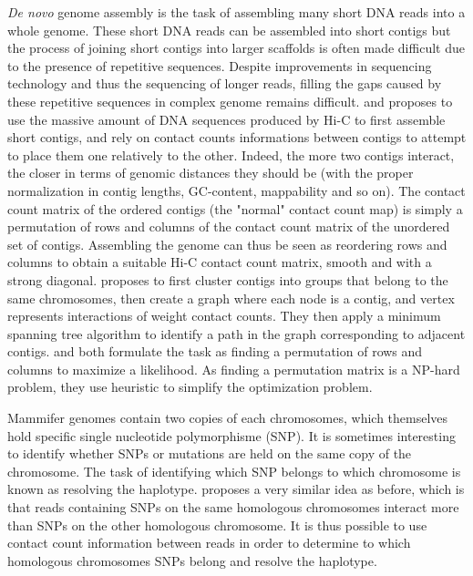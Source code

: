 \textit{De novo} genome assembly is the task of assembling many short DNA
reads into a whole genome. These short DNA reads can be assembled into short
contigs but the process of joining short contigs into larger scaffolds is
often made difficult due to the presence of repetitive sequences. Despite
improvements in sequencing technology and thus the sequencing of longer reads,
filling the gaps caused by these repetitive sequences in complex genome
remains difficult. \citet{burton:chromosome} and
\citet{kaplan:high-throughput} proposes to use the massive amount of DNA
sequences produced by Hi-C to first assemble short contigs, and rely on
contact counts informations between contigs to attempt to place them one
relatively to the other. Indeed, the more two contigs interact, the closer in
terms of genomic distances they should be (with the proper normalization in
contig lengths, GC-content, mappability and so on). The contact count matrix
of the ordered contigs (the "normal" contact count map) is simply a
permutation of rows and columns of the contact count matrix of the unordered
set of contigs. Assembling the genome can thus be seen as reordering rows and
columns to obtain a suitable Hi-C contact count matrix, smooth and with a
strong diagonal. \citet{burton:chromosome} proposes to first cluster contigs
into groups that belong to the same chromosomes, then create a graph where
each node is a contig, and vertex represents interactions of weight contact
counts. They then apply a minimum spanning tree algorithm to identify a path
in the graph corresponding to adjacent contigs. \citet{kaplan:high-throughput}
and \citet{marie-nelly:high-quality} both formulate the task as finding a
permutation of rows and columns to maximize a likelihood. As finding a
permutation matrix is a NP-hard problem, they use heuristic to simplify the
optimization problem.

Mammifer genomes contain two copies of each chromosomes, which themselves hold
specific single nucleotide polymorphisme (SNP). It is sometimes interesting to
identify whether SNPs or mutations are held on the same copy of the
chromosome. The task of identifying which SNP belongs to which chromosome is
known as resolving the haplotype. \citet{selvaraj:whole-genome}
proposes a very similar idea as
before, which is that reads containing SNPs on the same homologous chromosomes
interact more than SNPs on the other homologous chromosome. It is thus
possible to use contact count information between reads in order to determine
to which homologous chromosomes SNPs belong and resolve the haplotype.

